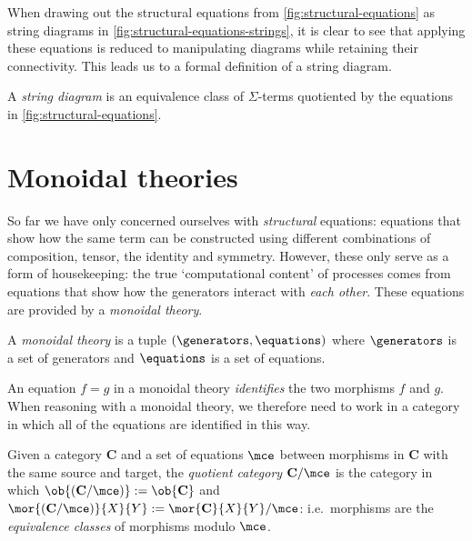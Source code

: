 When drawing out the structural equations from \cref{fig:structural-equations}
as string diagrams in \cref{fig:structural-equations-strings}, it is clear to
see that applying these equations is reduced to manipulating diagrams while
retaining their connectivity.
This leads us to a formal definition of a string diagram.

\begin{definition}
    A \emph{string diagram} is an equivalence class of \(\Sigma\)-terms
    quotiented by the equations in \cref{fig:structural-equations}.
\end{definition}



\section{Monoidal theories}

So far we have only concerned ourselves with \emph{structural} equations:
equations that show how the same term can be constructed using different
combinations of composition, tensor, the identity and symmetry.
However, these only serve as a form of housekeeping: the true `computational
content' of processes comes from equations that show how the generators interact
with \emph{each other}.
These equations are provided by a \emph{monoidal theory}.

\begin{definition}
    A \emph{monoidal theory} is a tuple \((\generators, \equations)\) where
    \(\generators\) is a set of generators and \(\equations\) is a set of
    equations.
\end{definition}

An equation \(f = g\) in a monoidal theory \emph{identifies} the two morphisms
\(f\) and \(g\).
When reasoning with a monoidal theory, we therefore need to work in a category
in which all of the equations are identified in this way.

\begin{definition}
    Given a category \(\mathbf{C}\) and a set of equations \(\mce\) between
    morphisms in \(\mathbf{C}\) with the same source and target, the
    \emph{quotient category} \(\mathbf{C} / \mce\) is the category in which
    \(\ob{(\mathbf{C} / \mce)} := \ob{\mathbf{C}}\) and \(
            \mor{(\mathbf{C} / \mce)}{X}{Y}
            :=
            \mor{\mathbf{C}}{X}{Y} / \mce
    \): i.e.\ morphisms are the \emph{equivalence classes} of morphisms
    modulo \(\mce\).
\end{definition}

